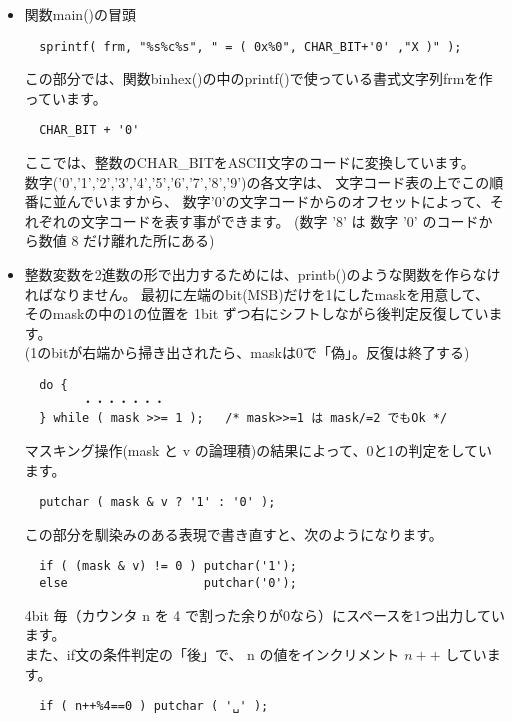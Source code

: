 \documentclass[uplatex, a4paper,11pt]{jsarticle}
\begin{document}
\begin{itemize}
\item 関数main()の冒頭
\begin{verbatim}
  sprintf( frm, "%s%c%s", " = ( 0x%0", CHAR_BIT+'0' ,"X )" );  
\end{verbatim}
この部分では、関数binhex()の中のprintf()で使っている書式文字列frmを作っています。
\begin{verbatim}
  CHAR_BIT + '0'
\end{verbatim}
ここでは、整数のCHAR\_BITをASCII文字のコードに変換しています。\\
数字('0','1','2','3','4','5','6','7','8','9')の各文字は、
文字コード表の上でこの順番に並んでいますから、
数字'0'の文字コードからのオフセットによって、それぞれの文字コードを表す事ができます。
(数字 '8' は 数字 '0' のコードから数値 8 だけ離れた所にある)
\item 整数変数を2進数の形で出力するためには、printb()のような関数を作らなければなりません。
最初に左端のbit(MSB)だけを1にしたmaskを用意して、
そのmaskの中の1の位置を 1bit ずつ右にシフトしながら後判定反復しています。\\
(1のbitが右端から掃き出されたら、maskは0で「偽」。反復は終了する)
\begin{verbatim}
  do {
        ・・・・・・・
  } while ( mask >>= 1 );   /* mask>>=1 は mask/=2 でもOk */
\end{verbatim}
マスキング操作(mask と v の論理積)の結果によって、0と1の判定をしています。
\begin{verbatim}
  putchar ( mask & v ? '1' : '0' );
\end{verbatim}
この部分を馴染みのある表現で書き直すと、次のようになります。
\begin{verbatim}
  if ( (mask & v) != 0 ) putchar('1');
  else                   putchar('0');
\end{verbatim}
4bit 毎（カウンタ n を 4 で割った余りが0なら）にスペースを1つ出力しています。\\
また、if文の条件判定の「後」で、 n の値をインクリメント $n++$ しています。
\begin{verbatim}
  if ( n++%4==0 ) putchar ( '␣' );
\end{verbatim}
\end{itemize}
\end{document}
